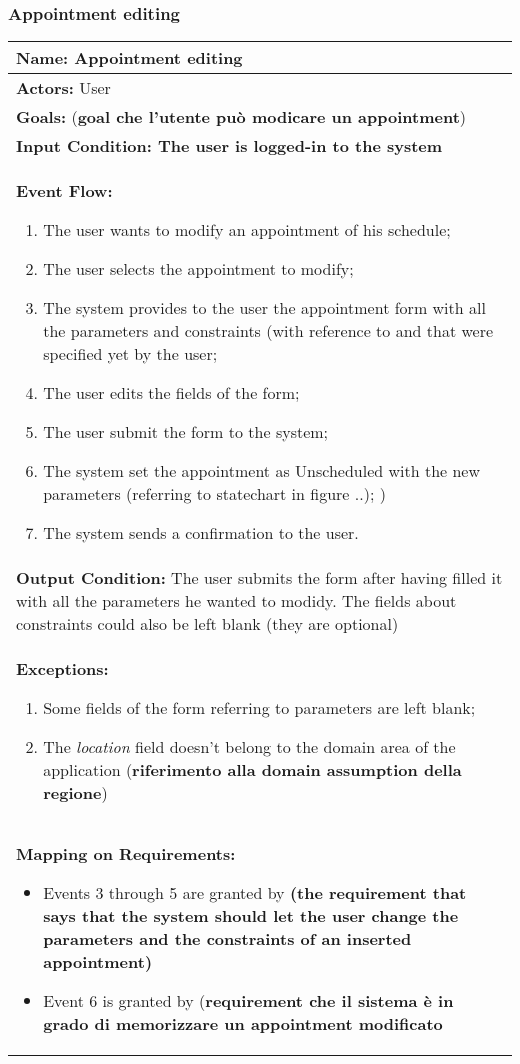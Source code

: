\subsubsection{Appointment editing}\label{usecase:appediting}
\begin{longtable}{|p{14cm}|} \hline
\textbf{Name:} Appointment editing \\ \hline
\textbf{Actors:} User \\ \hline
\textbf{Goals:} (\textbf{goal che l'utente può modicare un appointment})\\ \hline
\textbf{Input Condition: The user is logged-in to the system} \\ \hline
\textbf{Event Flow:}
\begin{enumerate}
\item The user wants to modify an appointment of his schedule;
\item The user selects the appointment to modify;
\item The system provides to the user the appointment form with all the parameters and constraints (with reference to %
and 
that were specified yet by the user; 
\item The user edits the fields of the form;
\item The user submit the form to the system;
\item The system set the appointment as Unscheduled with the new parameters (referring to statechart in figure ..); \label{fig:stchartApp})
\item The system sends a confirmation to the user.
\end{enumerate}	\\ \hline
\textbf{Output Condition:} The user submits the form after having filled it with all the parameters he wanted to modidy. The fields about constraints could also be left blank (they are optional) \\ \hline
\textbf{Exceptions:}
\begin{enumerate}
\item Some fields of the form referring to parameters are left blank;
\item The \textit{location} field doesn't belong to the domain area of the application (\textbf{riferimento alla domain assumption della regione})
\end{enumerate} \\ \hline
\textbf{Mapping on Requirements:}
\begin{itemize}
\item Events 3 through 5 are granted by \textbf{(the requirement that says that the system should let the user change the parameters and the constraints of an inserted appointment)}
\item Event 6 is granted by (\textbf{requirement che il sistema è in grado di memorizzare un appointment modificato}
\end{itemize}  \\ \hline

\end{longtable}

